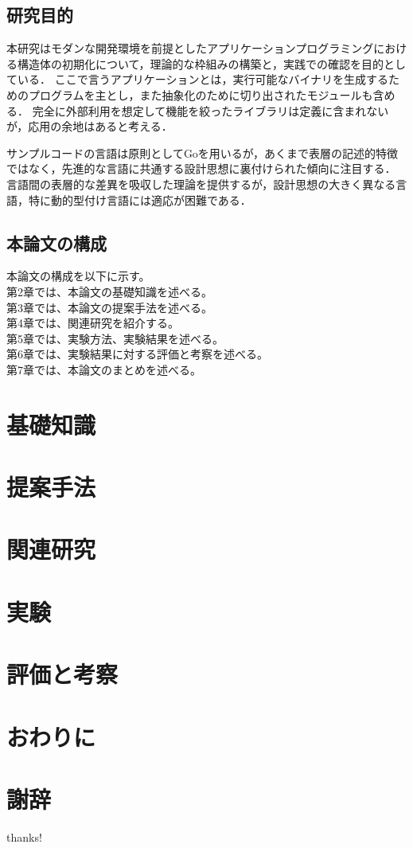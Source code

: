 \documentclass[a4paper,12pt]{jsreport}
\begin{document}
\section{研究目的}
本研究はモダンな開発環境を前提としたアプリケーションプログラミングにおける構造体の初期化について，理論的な枠組みの構築と，実践での確認を目的としている．
ここで言うアプリケーションとは，実行可能なバイナリを生成するためのプログラムを主とし，また抽象化のために切り出されたモジュールも含める．
完全に外部利用を想定して機能を絞ったライブラリは定義に含まれないが，応用の余地はあると考える．
\par
サンプルコードの言語は原則としてGoを用いるが，あくまで表層の記述的特徴ではなく，先進的な言語に共通する設計思想に裏付けられた傾向に注目する．
言語間の表層的な差異を吸収した理論を提供するが，設計思想の大きく異なる言語，特に動的型付け言語には適応が困難である．

\section{本論文の構成}
本論文の構成を以下に示す。\\
第2章では、本論文の基礎知識を述べる。\\
第3章では、本論文の提案手法を述べる。\\
第4章では、関連研究を紹介する。\\
第5章では、実験方法、実験結果を述べる。\\
第6章では、実験結果に対する評価と考察を述べる。\\
第7章では、本論文のまとめを述べる。

\chapter{基礎知識}
\chapter{提案手法}
\chapter{関連研究}
\chapter{実験}
\chapter{評価と考察}
\chapter{おわりに}
\chapter*{謝辞}
thanks!

\newpage
\renewcommand{\bibname}{参考文献}
\begin{thebibliography}{2}
\end{thebibliography}

\newpage
\end{document}
